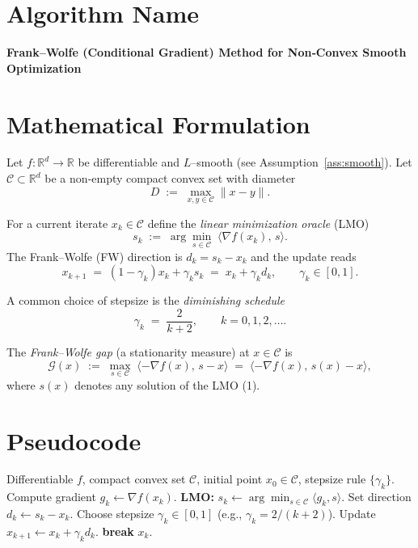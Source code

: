 \documentclass{article}
\newcommand{\C}{\mathcal{C}}
\newcommand{\R}{\mathbb{R}}
\begin{document}
\section*{Algorithm Name}
\textbf{Frank–Wolfe (Conditional Gradient) Method for Non‑Convex Smooth Optimization}

\section*{Mathematical Formulation}
Let $f:\R^{d}\rightarrow\R$ be differentiable and $L$–smooth (see Assumption~\ref{ass:smooth}).  
Let $\C\subset\R^{d}$ be a non‑empty compact convex set with diameter
\[
D\;:=\;\max_{x,y\in\C}\|x-y\| .
\]

For a current iterate $x_{k}\in\C$ define the \emph{linear minimization oracle} (LMO)
\[
s_{k}\;:=\;\arg\min_{s\in\C}\;\langle\nabla f(x_{k}),\,s\rangle .
\tag{1}
\]
The Frank–Wolfe (FW) direction is $d_{k}=s_{k}-x_{k}$ and the update reads
\[
x_{k+1}\;=\;(1-\gamma_{k})x_{k}+\gamma_{k}s_{k}
\;=\;x_{k}+\gamma_{k}d_{k},
\qquad \gamma_{k}\in[0,1].
\tag{2}
\]

A common choice of stepsize is the \emph{diminishing schedule}
\[
\gamma_{k}\;=\;\frac{2}{k+2},\qquad k=0,1,2,\dots .
\tag{3}
\]

The \emph{Frank–Wolfe gap} (a stationarity measure) at $x\in\C$ is
\[
\mathcal{G}(x)\;:=\;\max_{s\in\C}\;\langle -\nabla f(x),\,s-x\rangle
\;=\;\langle -\nabla f(x),\,s(x)-x\rangle,
\tag{4}
\]
where $s(x)$ denotes any solution of the LMO (1).

\section*{Pseudocode}
\begin{algorithm}[H]
\caption{Frank–Wolfe for Non‑Convex Smooth Problems}
\begin{algorithmic}[1]
\Require Differentiable $f$, compact convex set $\C$, initial point $x_{0}\in\C$, stepsize rule $\{\gamma_{k}\}$.
    \State Compute gradient $g_{k}\gets\nabla f(x_{k})$.
    \State \textbf{LMO:} $s_{k}\gets\arg\min_{s\in\C}\langle g_{k},s\rangle$.
    \State Set direction $d_{k}\gets s_{k}-x_{k}$.
    \State Choose stepsize $\gamma_{k}\in[0,1]$ (e.g., $\gamma_{k}=2/(k+2)$).
    \State Update $x_{k+1}\gets x_{k}+\gamma_{k}d_{k}$.
        \State \textbf{break}
    \EndIf
\EndFor
\State \Return $x_{k}$.
\end{algorithmic}
\end{algorithm}
\end{document}
